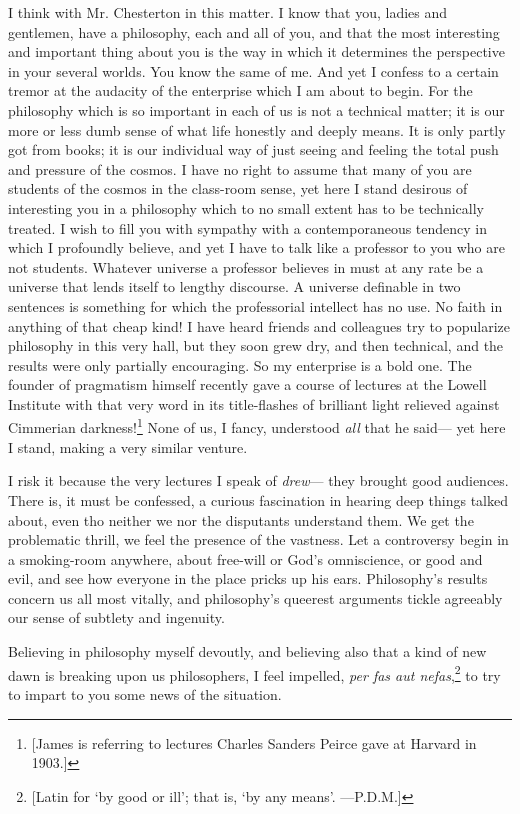 \documentclass[]{article}
\begin{document}
I think with Mr. Chesterton in this matter. I know that you, ladies and
gentlemen, have a philosophy, each and all of you, and that the most
interesting and important thing about you is the way in which it
determines the perspective in your several worlds. You know the same
of me. And yet I confess to a certain tremor at the audacity of the
enterprise which I am about to begin. For the philosophy which is so
important in each of us is not a technical matter; it is our more or
less dumb sense of what life honestly and deeply means. It is only
partly got from books; it is our individual way of just seeing and
feeling the total push and pressure of the cosmos. I have no right to
assume that many of you are students of the cosmos in the class-room
sense, yet here I stand desirous of interesting you in a philosophy
which to no small extent has to be technically treated. I wish to fill
you with sympathy with a contemporaneous tendency in which I profoundly
believe, and yet I have to talk like a professor to you who are not
students. Whatever universe a professor believes in must at any rate be
a universe that lends itself to lengthy discourse. A universe definable
in two sentences is something for which the professorial intellect has
no use. No faith in anything of that cheap kind! I have heard friends
and colleagues try to popularize philosophy in this very hall, but they
soon grew dry, and then technical, and the results were only partially
encouraging. So my enterprise is a bold one. The founder of pragmatism
himself recently gave a course of lectures at the Lowell Institute with
that very word in its title-flashes of brilliant light relieved
against Cimmerian darkness!\footnote{[James is referring to lectures Charles Sanders Peirce gave at Harvard in 1903.]}
None of us, I fancy, understood \emph{all} that he
said--- yet here I stand, making a very similar venture.

I risk it because the very lectures I speak of \emph{drew}--- they brought good
audiences. There is, it must be confessed, a curious fascination in
hearing deep things talked about, even tho neither we nor the disputants
understand them. We get the problematic thrill, we feel the presence of
the vastness. Let a controversy begin in a smoking-room anywhere, about
free-will or God's omniscience, or good and evil, and see how everyone
in the place pricks up his ears. Philosophy's results concern us all
most vitally, and philosophy's queerest arguments tickle agreeably our
sense of subtlety and ingenuity.

Believing in philosophy myself devoutly, and believing also that a kind
of new dawn is breaking upon us philosophers, I feel impelled, \emph{per fas
aut nefas},\footnote{[Latin for `by good or ill'; that is, `by any means'. ---P.D.M.]} to try to impart to you some news of the situation.
\end{document}
